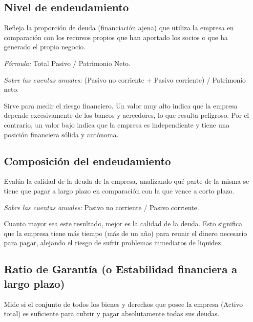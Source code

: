 \documentclass[12pt]{book} %
\begin{document}
\hypertarget{nivel-de-endeudamiento}{%
\subsection{Nivel de endeudamiento}\label{nivel-de-endeudamiento}}

Refleja la proporción de deuda (financiación ajena) que utiliza la
empresa en comparación con los recursos propios que han aportado los
socios o que ha generado el propio negocio.

\emph{Fórmula:} Total Pasivo / Patrimonio Neto.

\emph{Sobre las cuentas anuales:} (Pasivo no corriente + Pasivo
corriente) / Patrimonio neto.

Sirve para medir el riesgo financiero. Un valor muy alto indica que la
empresa depende excesivamente de los bancos y acreedores, lo que resulta
peligroso. Por el contrario, un valor bajo indica que la empresa es
independiente y tiene una posición financiera sólida y autónoma.

\hypertarget{composiciuxf3n-del-endeudamiento}{%
\subsection{Composición del
endeudamiento}\label{composiciuxf3n-del-endeudamiento}}

Evalúa la calidad de la deuda de la empresa, analizando qué parte de la
misma se tiene que pagar a largo plazo en comparación con la que vence a
corto plazo.

\emph{Sobre las cuentas anuales:} Pasivo no corriente / Pasivo
corriente.

Cuanto mayor sea este resultado, mejor es la calidad de la deuda. Esto
significa que la empresa tiene más tiempo (más de un año) para reunir el
dinero necesario para pagar, alejando el riesgo de sufrir problemas
inmediatos de liquidez.

\hypertarget{ratio-de-garantuxeda-o-estabilidad-financiera-a-largo-plazo}{%
\subsection{Ratio de Garantía (o Estabilidad financiera a largo
plazo)}\label{ratio-de-garantuxeda-o-estabilidad-financiera-a-largo-plazo}}

Mide si el conjunto de todos los bienes y derechos que posee la empresa
(Activo total) es suficiente para cubrir y pagar absolutamente todas sus
deudas.
\end{document}
